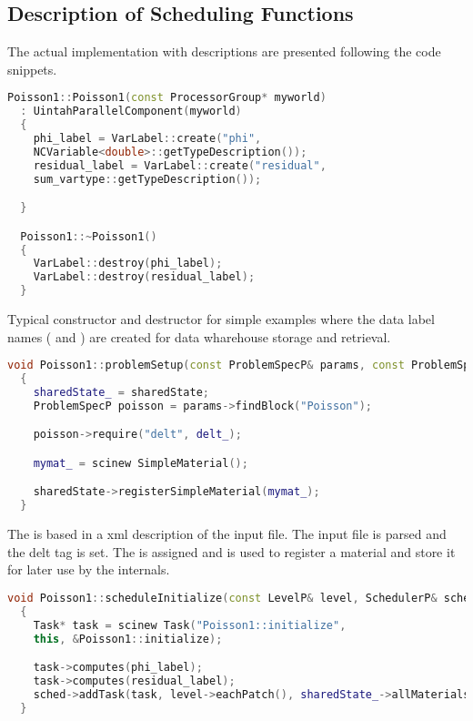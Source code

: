 \subsection{Description of Scheduling Functions}

The actual implementation with descriptions are presented following
the code snippets.

\begin{lstlisting}[language=Cpp]
  Poisson1::Poisson1(const ProcessorGroup* myworld)
  : UintahParallelComponent(myworld)
  {
    phi_label = VarLabel::create("phi", 
    NCVariable<double>::getTypeDescription());
    residual_label = VarLabel::create("residual", 
    sum_vartype::getTypeDescription());

  }

  Poisson1::~Poisson1()
  {
    VarLabel::destroy(phi_label);
    VarLabel::destroy(residual_label);
  }
\end{lstlisting}

Typical constructor and destructor for simple examples where the data
label names ( and ) are created for data
wharehouse storage and retrieval.

\begin{lstlisting}[language=Cpp]
  void Poisson1::problemSetup(const ProblemSpecP& params, const ProblemSpecP& restart_prob_spec, GridP& /*grid*/, SimulationStateP& sharedState)
  {
    sharedState_ = sharedState;
    ProblemSpecP poisson = params->findBlock("Poisson");

    poisson->require("delt", delt_);

    mymat_ = scinew SimpleMaterial();

    sharedState->registerSimpleMaterial(mymat_);
  }
\end{lstlisting}

The  is based in a xml description of the input
file.  The input file is parsed and the delt tag is set.  The
 is assigned and is used to register a material
and store it for later use by the \Vaango internals.

\begin{lstlisting}[language=Cpp]
  void Poisson1::scheduleInitialize(const LevelP& level, SchedulerP& sched)
  {
    Task* task = scinew Task("Poisson1::initialize",
    this, &Poisson1::initialize);

    task->computes(phi_label);
    task->computes(residual_label);
    sched->addTask(task, level->eachPatch(), sharedState_->allMaterials());
  }
\end{lstlisting}

